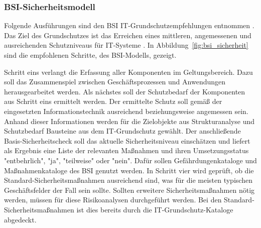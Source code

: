 \documentclass[11pt,a4paper]{report}
\begin{document}
\subsubsection{BSI-Sicherheitsmodell}

Folgende Ausführungen sind den BSI IT-Grundschutzempfehlungen entnommen \cite{bsi_grundsch1,bsi_grundsch2,bsi_grundsch3,bsi_grundsch4}.
Das Ziel des Grundschutzes ist das Erreichen eines mittleren, angemessenen und ausreichenden Schutzniveaus für IT-Systeme \cite{wiki_itgrundschutz}. In Abbildung~\ref{fig:bsi_sicherheit} sind die empfohlenen Schritte, des BSI-Modells, gezeigt. 

Schritt eins verlangt die Erfassung aller Komponenten im Geltungsbereich. Dazu soll das Zusammenspiel zwischen Geschäftsprozessen und Anwendungen herausgearbeitet werden. Als nächstes soll der Schutzbedarf der Komponenten aus Schritt eins ermittelt werden. Der ermittelte Schutz soll gemäß der eingesetzten Informationstechnik ausreichend beziehungsweise angemessen sein. Anhand dieser Informationen werden für die Zielobjekte aus Strukturanalyse und Schutzbedarf Bausteine aus dem IT-Grundschutz gewählt. Der anschließende Basis-Sicherheitscheck soll das aktuelle Sicherheitsniveau einschätzen und liefert als Ergebnis eine Liste der relevanten Maßnahmen und ihren Umsetzungsstatus "entbehrlich", "ja", "teilweise" oder "nein". Dafür sollen Gefährdungenkataloge und Maßnahmenkataloge des BSI genutzt werden. In Schritt vier wird geprüft, ob die Standard-Sicherheitsmaßnahmen ausreichend sind, was für die meisten typischen Geschäftsfelder der Fall sein sollte. Sollten erweitere Sicherheitsmaßnahmen nötig werden, müssen für diese Risikoanalysen durchgeführt werden. Bei den Standard-Sicherheitsmaßnahmen ist dies bereits durch die IT-Grundschutz-Kataloge abgedeckt. 
\end{document}
